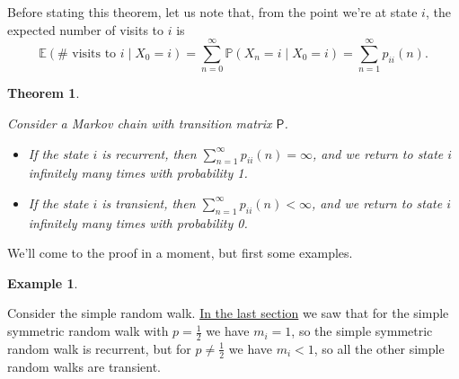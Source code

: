 \documentclass[
  a4paper,
]{article}
\providecommand{\tightlist}{%
  \setlength{\itemsep}{0pt}\setlength{\parskip}{0pt}}
\newtheorem{theorem}{Theorem}[section]
\theoremstyle{definition}
\theoremstyle{definition}
\newtheorem{example}{Example}[section]
\theoremstyle{definition}
\theoremstyle{remark}
\begin{document}
Before stating this theorem, let us note that, from the point we're at state \(i\), the expected number of visits to \(i\) is
\[
\mathbb E(\#\text{ visits to $i$} \mid X_0 = i) = \sum_{n=0}^\infty \mathbb P(X_n = i \mid X_0 = i) = \sum_{n=1}^\infty p_{ii}(n) .
\]

\begin{theorem}
\protect\hypertarget{thm:rectran}{}\label{thm:rectran}

Consider a Markov chain with transition matrix \(\mathsf P\).

\begin{itemize}
\tightlist
\item
  If the state \(i\) is recurrent, then \(\sum_{n=1}^\infty p_{ii}(n) = \infty\), and we return to state \(i\) infinitely many times with probability 1.
\item
  If the state \(i\) is transient, then \(\sum_{n=1}^\infty p_{ii}(n) < \infty\), and we return to state \(i\) infinitely many times with probability 0.
\end{itemize}

\end{theorem}

We'll come to the proof in a moment, but first some examples.

\begin{example}
\protect\hypertarget{exm:rw-rec-trans}{}\label{exm:rw-rec-trans}

Consider the simple random walk. \protect\hyperlink{S08-return-rw}{In the last section} we saw that for the simple symmetric random walk with \(p = \frac12\) we have \(m_i = 1\), so the simple symmetric random walk is recurrent, but for \(p \neq \frac12\) we have \(m_i < 1\), so all the other simple random walks are transient.

\end{example}
\end{document}
